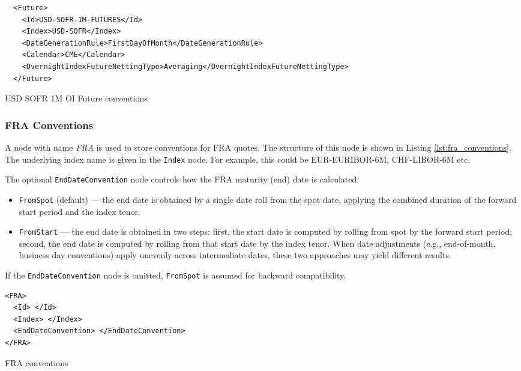 \begin{listing}[H]
\begin{verbatim}
  <Future>
    <Id>USD-SOFR-1M-FUTURES</Id>
    <Index>USD-SOFR</Index>
    <DateGenerationRule>FirstDayOfMonth</DateGenerationRule>
    <Calendar>CME</Calendar>
    <OvernightIndexFutureNettingType>Averaging</OvernightIndexFutureNettingType>
  </Future>
\end{verbatim}
\caption{USD SOFR 1M OI Future conventions}
\label{lst:future_conventions_sofr_1m}
\end{listing}


\subsubsection{FRA Conventions}
A node with name \emph{FRA} is used to store conventions for FRA quotes. The structure of this node is shown in Listing
\ref{lst:fra_conventions}. The underlying index name is given in the
\lstinline!Index! node. For example, this could be EUR-EURIBOR-6M, CHF-LIBOR-6M etc.

The optional \lstinline!EndDateConvention! node controls how the FRA maturity (end) date is calculated:
\begin{itemize}
\item \lstinline!FromSpot! (default) --- the end date is obtained by a single date roll from the spot date, applying the combined duration of the forward start period and the index tenor.
\item \lstinline!FromStart! --- the end date is obtained in two steps: first, the start date is computed by rolling from spot by the forward start period; second, the end date is computed by rolling from that start date by the index tenor. When date adjustments (e.g., end-of-month, business day conventions) apply unevenly across intermediate dates, these two approaches may yield different results.
\end{itemize}
If the \lstinline!EndDateConvention! node is omitted, \lstinline!FromSpot! is assumed for backward compatibility.

\begin{listing}[H]
\begin{verbatim}
<FRA>
  <Id> </Id>
  <Index> </Index>
  <EndDateConvention> </EndDateConvention>
</FRA>
\end{verbatim}
\caption{FRA conventions}
\label{lst:fra_conventions}
\end{listing}


